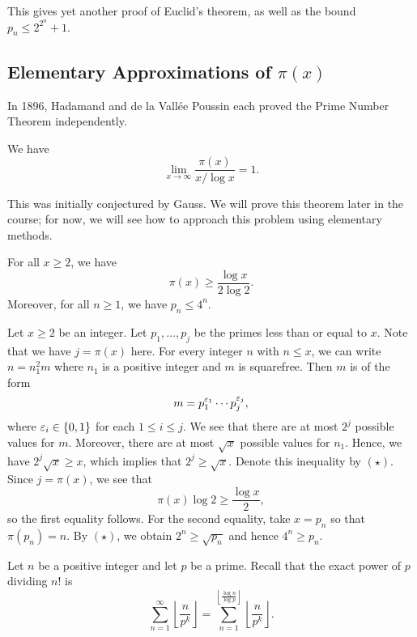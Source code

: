 This gives yet another proof of Euclid's theorem, as well as the bound $p_n \leq 2^{2^n} + 1$. 

\subsection{Elementary Approximations of $\pi(x)$}
In 1896, Hadamand and de la Vall\'ee Poussin each proved the Prime Number Theorem independently. 

\begin{thm}
We have 
\[ \lim_{x\to\infty} \frac{\pi(x)}{x/\log x} = 1. \]
\end{thm}

This was initially conjectured by Gauss. We will prove this theorem later in the course; 
for now, we will see how to approach this problem using elementary methods. 

\begin{thm}
For all $x \geq 2$, we have 
\[ \pi(x) \geq \frac{\log x}{2\log 2}. \]
Moreover, for all $n \geq 1$, we have $p_n \leq 4^n$.
\end{thm}
\begin{pf}
Let $x \geq 2$ be an integer. Let $p_1, \dots, p_j$ be the primes less than or equal to $x$. 
Note that we have $j = \pi(x)$ here. For every integer $n$ with $n \leq x$, we can write $n = n_1^2m$
where $n_1$ is a positive integer and $m$ is squarefree. Then $m$ is of the form 
\[ m = p_1^{\varepsilon_1} \cdots p_j^{\varepsilon_j}, \]
where $\varepsilon_i \in \{0, 1\}$ for each $1 \leq i \leq j$. We see that there are at most $2^j$ possible 
values for $m$. Moreover, there are at most $\sqrt{x}$ possible values for $n_1$. Hence, we have 
$2^j \sqrt{x} \geq x$, which implies that $2^j \geq \sqrt{x}$. Denote this inequality by $(\star)$. 
Since $j = \pi(x)$, we see that 
\[ \pi(x) \log 2 \geq \frac{\log x}2, \]
so the first equality follows. For the second equality, take $x = p_n$ so that $\pi(p_n) = n$. 
By $(\star)$, we obtain $2^n \geq \sqrt{p_n}$ and hence $4^n \geq p_n$. 
\end{pf}

Let $n$ be a positive integer and let $p$ be a prime. Recall that the exact power of $p$ 
dividing $n!$ is 
\[ \sum_{n=1}^\infty \left\lfloor \frac{n}{p^k} \right\rfloor = \sum_{n=1}^{\left\lfloor \frac{\log n}{\log p} \right\rfloor} \left\lfloor \frac{n}{p^k} \right\rfloor. \]

